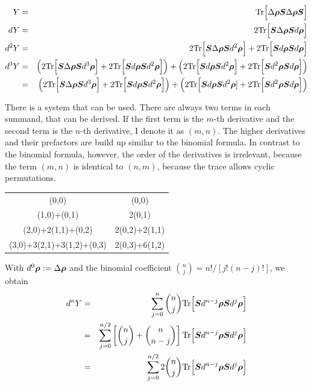 \documentclass[11pt,a4paper]{report}
\begin{document}
\begin{eqnarray}
Y&=&\mathrm{Tr}\Bigl[\Delta\bm{\rho}\bm{S}\Delta\bm{\rho}\bm{S}\Bigr]
\nonumber\\
dY&=&2\mathrm{Tr}\Bigl[\bm{S}\Delta\bm{\rho}\bm{S}d\bm{\rho}\Bigr]
\nonumber\\
d^2Y&=&
2\mathrm{Tr}\Bigl[\bm{S}\Delta\bm{\rho}\bm{S}d^2\bm{\rho}\Bigr]
+2\mathrm{Tr}\Bigl[\bm{S}d\bm{\rho}\bm{S}d\bm{\rho}\Bigr]
\nonumber\\
d^3Y&=&
\Bigl(2\mathrm{Tr}\Bigl[\bm{S}\Delta\bm{\rho}\bm{S}d^3\bm{\rho}\Bigr]
+2\mathrm{Tr}\Bigl[\bm{S}d\bm{\rho}\bm{S}d^2\bm{\rho}\Bigr]\Bigr)
+\Bigl(2\mathrm{Tr}\Bigl[\bm{S}d\bm{\rho}\bm{S}d^2\bm{\rho}\Bigr]
+2\mathrm{Tr}\Bigl[\bm{S}d^2\bm{\rho}\bm{S}d\bm{\rho}\Bigr]\Bigr)
\nonumber\\
&=&
\Bigl(2\mathrm{Tr}\Bigl[\bm{S}\Delta\bm{\rho}\bm{S}d^3\bm{\rho}\Bigr]
+2\mathrm{Tr}\Bigl[\bm{S}d\bm{\rho}\bm{S}d^2\bm{\rho}\Bigr]\Bigr)
+\Bigl(2\mathrm{Tr}\Bigl[\bm{S}d\bm{\rho}\bm{S}d^2\bm{\rho}]
+2\mathrm{Tr}\Bigl[\bm{S}d^2\bm{\rho}\bm{S}d\bm{\rho}\Bigr]\Bigr)
\end{eqnarray}

There is a system that can be used. There are always two terms in each
summand, that can be derived. If the first term is the $m$-th
derivative and the second term is the $n$-th derivative, I denote it
as $(m,n)$. The higher derivatives and their prefactors are build up
similar to the binomial formula. In contrast to the binomial formula,
however, the order of the derivatives is irrelevant, because the term
$(m,n)$ is identical to $(n,m)$, because the trace allows cyclic
permutations.
\begin{center}
\begin{tabular}{|c|c|}
\hline
(0,0) & (0,0)\\
(1,0)+(0,1) & 2(0,1)\\
(2,0)+2(1,1)+(0,2) &2(0,2)+2(1,1)\\
(3,0)+3(2,1)+3(1,2)+(0,3) &2(0,3)+6(1,2)\\
\hline
\end{tabular}
\end{center}

With $d^0\bm{\rho}:=\Delta\bm{\rho}$ and
the binomial coefficient $\binom{n}{j}=n!/[j!(n-j)!]$, we obtain
\begin{eqnarray}
d^nY
&=&\sum_{j=0}^n \binom{n}{j} 
\mathrm{Tr}\Bigl[\bm{S}d^{n-j}\bm{\rho}\bm{S}d^j\bm{\rho}\Bigr]
\nonumber\\
&=&\sum_{j=0}^{n/2} \left[\binom{n}{j} +\binom{n}{n-j}\right] 
\mathrm{Tr}\Bigl[\bm{S}d^{n-j}\bm{\rho}\bm{S}d^j\bm{\rho}\Bigr]
\nonumber\\
&=&\sum_{j=0}^{n/2} 2\binom{n}{j}
\mathrm{Tr}\Bigl[\bm{S}d^{n-j}\bm{\rho}\bm{S}d^j\bm{\rho}\Bigr]
\end{eqnarray}
\end{document}
